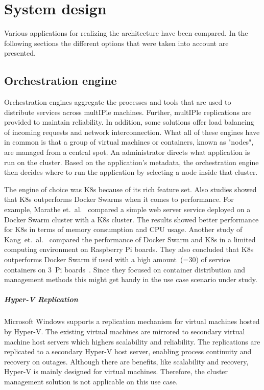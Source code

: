 \chapter{System design} %

\label{chap:design} %

Various applications for realizing the architecture have been compared. In the following sections the different options that were taken into account are presented.

\section{Orchestration engine}
Orchestration engines aggregate the processes and tools that are used to distribute services across mult\ac{IP}le machines. Further, mult\ac{IP}le replications are provided to maintain reliability. In addition, some solutions offer load balancing of incoming requests and network interconnection.
What all of these engines have in common is that a group of virtual machines or containers, known as "nodes", are managed from a central spot. An administrator directs what application is run on the cluster. Based on the application's metadata, the orchestration engine then decides where to run the application by selecting a node inside that cluster.

The engine of choice was \ac{K8s} because of its rich feature set.
Also studies showed that \ac{K8s} outperforms Docker Swarms when it comes to performance. For example, Marathe et.~al.~\cite{Marathe.2019} compared a simple web server service deployed on a Docker Swarm cluster with a \ac{K8s} cluster. The results showed better performance for \ac{K8s} in terms of memory consumption and CPU usage. Another study of Kang~et.~al.~\cite{Kang.2021} compared the performance of Docker Swarm and \ac{K8s} in a limited computing environment on Raspberry Pi boards. They also concluded that \ac{K8s} outperforms Docker Swarm if used with a high amount~(=30) of service containers on 3~Pi boards~\cite{Kang.2021}. Since they focused on container distribution and management methods this might get handy in the use case scenario under study.

\paragraph{Hyper-V Replication}
Microsoft Windows supports a replication mechanism for virtual machines hosted by Hyper-V. The existing virtual machines are mirrored to secondary virtual machine host servers which highers scalability and reliability. The replications are replicated to a secondary Hyper-V host server, enabling process continuity and recovery on outages.
Although there are benefits, like scalability and recovery, Hyper-V is mainly designed for virtual machines. Therefore, the cluster management solution is not applicable on this use case.

